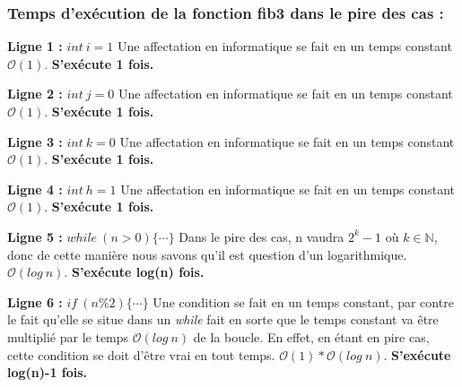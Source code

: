 \documentclass[12pt]{article}
\begin{document}
	  \newpage

      \subsubsection*{Temps d'exécution de la fonction fib3 dans le pire des cas :}

  	    \noindent \textbf{Ligne 1 :} \( int \: i = 1 \) \newline
        Une affectation en informatique se fait en un temps constant
        \( \mathcal{O}(1) \). \newline
        \textbf{S'exécute 1 fois.} \newline

        \noindent \textbf{Ligne 2 :} \( int \: j = 0 \) \newline
        Une affectation en informatique se fait en un temps constant
        \( \mathcal{O}(1) \). \newline
        \textbf{S'exécute 1 fois.} \newline

        \noindent \textbf{Ligne 3 :} \( int \: k = 0 \) \newline
        Une affectation en informatique se fait en un temps constant
        \( \mathcal{O}(1) \). \newline
 		\textbf{S'exécute 1 fois.} \newline

        \noindent \textbf{Ligne 4 :} \( int \: h = 1 \) \newline
        Une affectation en informatique se fait en un temps constant
        \( \mathcal{O}(1) \). \newline
		\textbf{S'exécute 1 fois.} \newline

        \noindent \textbf{Ligne 5 :} \( while \: (n>0) \{ \cdots \} \) \newline
        Dans le pire des cas, n vaudra \( 2^k - 1 \) où \(k \in \mathbb{N} \), donc de cette manière nous         savons qu'il est question d'un logarithmique.
        \( \mathcal{O}(log \: n) \). \newline
		\textbf{S'exécute log(n) fois.} \newline

        \noindent \textbf{Ligne 6 :}  \( if \: (n\%2)\{ \cdots \} \) \newline
        Une condition se fait en un temps constant, par contre le fait qu'elle se situe dans un \textit{while} fait en sorte que le temps constant va être multiplié par le temps \( \mathcal{O}(log \: n) \) de la boucle. En effet, en étant en pire cas, cette condition se doit d'être vrai en tout temps.
        \( \mathcal{O}(1)*\mathcal{O}(log \: n) \). \newline
		\textbf{S'exécute log(n)-1 fois.} \newline
\end{document}
